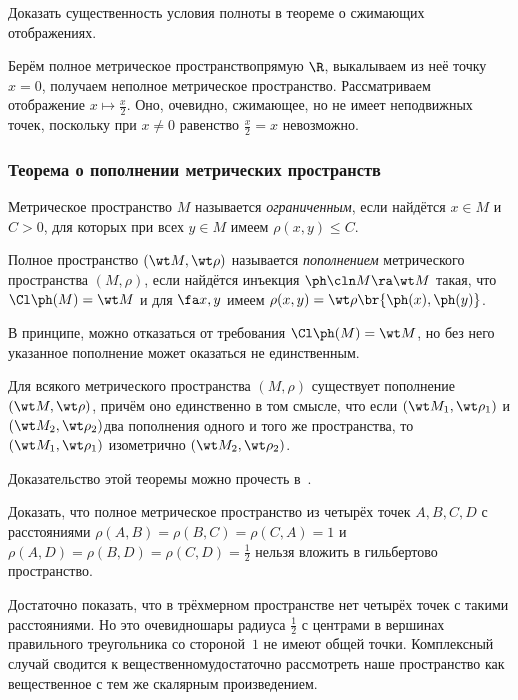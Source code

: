 \documentclass[a4paper]{article}
\begin{document}
\begin{problem}
Доказать существенность условия полноты в теореме о сжимающих отображениях.
\end{problem}
\begin{solution}
Берём полное метрическое пространство\т прямую $\R$, выкалываем из неё точку $x = 0$,
получаем неполное метрическое пространство.
Рассматриваем отображение $x \mapsto \frac x2$. Оно, очевидно, сжимающее,
но не имеет неподвижных точек, поскольку при $x \neq 0$ равенство $\frac x 2 = x$ невозможно.
\end{solution}

\subsubsection{Теорема о пополнении метрических пространств}

\begin{df}
Метрическое пространство $M$ называется \emph{ограниченным}, если найдётся $x \in M$ и $C > 0$, для которых
при всех $y \in M$ имеем $\rho(x,y) \le C$.
\end{df}

\begin{df}
Полное пространство $(\wt M, \wt \rho)$ называется \emph{пополнением} метрического пространства $(M, \rho)$,
если найдётся инъекция $\ph\cln M \ra \wt M$ такая, что $\Cl \ph(M) = \wt M$ и для $\fa x,y$ имеем
$\rho(x,y) = \wt\rho\br{\ph(x), \ph(y)}$.
\end{df}

\begin{note}
В принципе, можно отказаться от требования $\Cl \ph(M) = \wt M$,
но без него указанное пополнение может оказаться не единственным.
\end{note}

\begin{theorem}
Для всякого метрического пространства $(M, \rho)$ существует
пополнение $(\wt M, \wt \rho)$, причём оно единственно в том смысле,
что если $(\wt M_1, \wt\rho_1)$ и $(\wt M_2, \wt\rho_2)$\т два пополнения одного и того
же пространства, то $(\wt M_1, \wt\rho_1)$ изометрично $(\wt M_2, \wt\rho_2)$.
\end{theorem}

Доказательство этой теоремы можно прочесть в~\cite[гл.~II, \S~3, п.~4]{kf}.

\begin{problem}
Доказать, что полное метрическое пространство из четырёх точек $A, B, C, D$ с расстояниями
$\rho(A,B) = \rho(B, C) = \rho(C,A) = 1$ и $\rho(A, D) = \rho(B, D) = \rho(C, D) = \frac12$
нельзя вложить в гильбертово пространство.
\end{problem}
\begin{solution}
Достаточно показать, что в трёхмерном пространстве нет четырёх точек с такими расстояниями.
Но это очевидно\т шары радиуса $\frac12$ с центрами в вершинах правильного треугольника со стороной~$1$
не имеют общей точки. Комплексный случай сводится к вещественному\т достаточно рассмотреть
наше пространство как вещественное с тем же скалярным произведением.
\end{solution}
\end{document}
